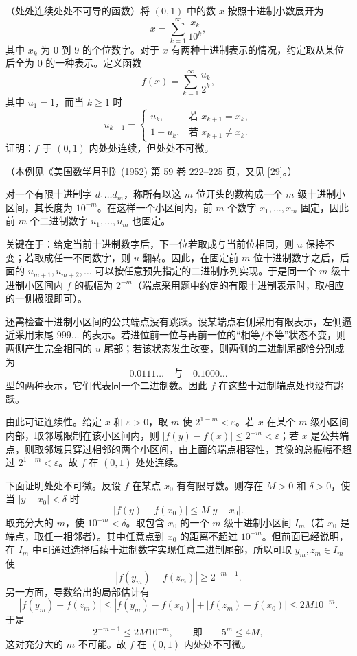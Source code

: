 \begin{xreferenceproblem}[14]
（处处连续处处不可导的函数）将 $(0,1)$ 中的数 $x$ 按照十进制小数展开为
\[
  x=\sum_{k=1}^{\infty}\frac{x_k}{10^k},
\]
其中 $x_k$ 为 0 到 9 的个位数字。对于 $x$ 有两种十进制表示的情况，约定取从某位后全为 0 的一种表示。定义函数
\[
  f(x)=\sum_{k=1}^{\infty}\frac{u_k}{2^k},
\]
其中 $u_1=1$，而当 $k\geqslant1$ 时
\[
  u_{k+1}=
  \begin{cases}
    u_k,&\text{若 }x_{k+1}=x_k,\\
    1-u_k,&\text{若 }x_{k+1}\ne x_k.
  \end{cases}
\]
证明：$f$ 于 $(0,1)$ 内处处连续，但处处不可微。

（本例见《美国数学月刊》(1952) 第 59 卷 222--225 页，又见 [29]。）
\end{xreferenceproblem}
\begin{xsolution}
对一个有限十进制字 $d_1\ldots d_m$，称所有以这 $m$ 位开头的数构成一个 $m$ 级十进制小区间，其长度为 $10^{-m}$。在这样一个小区间内，前 $m$ 个数字 $x_1,\ldots,x_m$ 固定，因此前 $m$ 个二进制数字 $u_1,\ldots,u_m$ 也固定。

关键在于：给定当前十进制数字后，下一位若取成与当前位相同，则 $u$ 保持不变；若取成任一不同数字，则 $u$ 翻转。因此，在固定前 $m$ 位十进制数字之后，后面的 $u_{m+1},u_{m+2},\ldots$ 可以按任意预先指定的二进制序列实现。于是同一个 $m$ 级十进制小区间内 $f$ 的振幅为 $2^{-m}$（端点采用题中约定的有限十进制表示时，取相应的一侧极限即可）。

还需检查十进制小区间的公共端点没有跳跃。设某端点右侧采用有限表示，左侧逼近采用末尾 $999\ldots$ 的表示。若进位前一位与再前一位的“相等/不等”状态不变，则两侧产生完全相同的 $u$ 尾部；若该状态发生改变，则两侧的二进制尾部恰分别成为
\[
  0.0111\ldots\quad\text{与}\quad0.1000\ldots
\]
型的两种表示，它们代表同一个二进制数。因此 $f$ 在这些十进制端点处也没有跳跃。

由此可证连续性。给定 $x$ 和 $\varepsilon>0$，取 $m$ 使 $2^{1-m}<\varepsilon$。若 $x$ 在某个 $m$ 级小区间内部，取邻域限制在该小区间内，则 $|f(y)-f(x)|\leqslant2^{-m}<\varepsilon$；若 $x$ 是公共端点，则取邻域只穿过相邻的两个小区间，由上面的端点相容性，其像的总振幅不超过 $2^{1-m}<\varepsilon$。故 $f$ 在 $(0,1)$ 处处连续。

下面证明处处不可微。反设 $f$ 在某点 $x_0$ 有有限导数。则存在 $M>0$ 和 $\delta>0$，使当 $|y-x_0|<\delta$ 时
\[
  |f(y)-f(x_0)|\leqslant M|y-x_0|.
\]
取充分大的 $m$，使 $10^{-m}<\delta$。取包含 $x_0$ 的一个 $m$ 级十进制小区间 $I_m$（若 $x_0$ 是端点，取任一相邻者）。其中任意点到 $x_0$ 的距离不超过 $10^{-m}$。但前面已经说明，在 $I_m$ 中可通过选择后续十进制数字实现任意二进制尾部，所以可取 $y_m,z_m\in I_m$ 使
\[
  |f(y_m)-f(z_m)|\geqslant2^{-m-1}.
\]
另一方面，导数给出的局部估计有
\[
  |f(y_m)-f(z_m)|
  \leqslant|f(y_m)-f(x_0)|+|f(z_m)-f(x_0)|
  \leqslant2M10^{-m}.
\]
于是
\[
  2^{-m-1}\leqslant2M10^{-m},
  \qquad\text{即}\qquad 5^m\leqslant4M,
\]
这对充分大的 $m$ 不可能。故 $f$ 在 $(0,1)$ 内处处不可微。
\end{xsolution}



